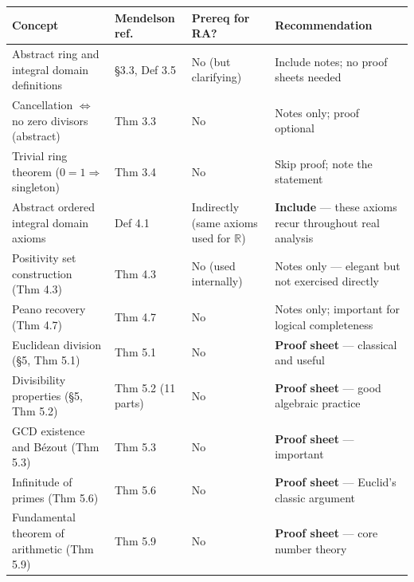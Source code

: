 \begin{exposition}
\smallskip
\end{exposition}
\begin{tabular}{p{} p{} p{} p{}}
\toprule
\textbf{Concept} & \textbf{Mendelson ref.} & \textbf{Prereq for RA?} & \textbf{Recommendation} \\
\midrule

Abstract ring and integral domain definitions
& \S{}3.3, Def 3.5
& No (but clarifying)
& Include notes; no proof sheets needed
\\[6pt]

Cancellation $\Leftrightarrow$ no zero divisors (abstract)
& Thm 3.3
& No
& Notes only; proof optional
\\[6pt]

Trivial ring theorem ($0=1\Rightarrow$ singleton)
& Thm 3.4
& No
& Skip proof; note the statement
\\[6pt]

Abstract ordered integral domain axioms
& Def 4.1
& Indirectly (same axioms used for $\mathbb{R}$)
& \textbf{Include} --- these axioms recur throughout real analysis
\\[6pt]

Positivity set construction (Thm 4.3)
& Thm 4.3
& No (used internally)
& Notes only --- elegant but not exercised directly
\\[6pt]

Peano recovery (Thm 4.7)
& Thm 4.7
& No
& Notes only; important for logical completeness
\\[6pt]

Euclidean division (\S{}5, Thm 5.1)
& Thm 5.1
& No
& \textbf{Proof sheet} --- classical and useful
\\[6pt]

Divisibility properties (\S{}5, Thm 5.2)
& Thm 5.2 (11 parts)
& No
& \textbf{Proof sheet} --- good algebraic practice
\\[6pt]

GCD existence and B\'{e}zout (Thm 5.3)
& Thm 5.3
& No
& \textbf{Proof sheet} --- important
\\[6pt]

Infinitude of primes (Thm 5.6)
& Thm 5.6
& No
& \textbf{Proof sheet} --- Euclid's classic argument
\\[6pt]

Fundamental theorem of arithmetic (Thm 5.9)
& Thm 5.9
& No
& \textbf{Proof sheet} --- core number theory
\\[6pt]


\end{tabular}

